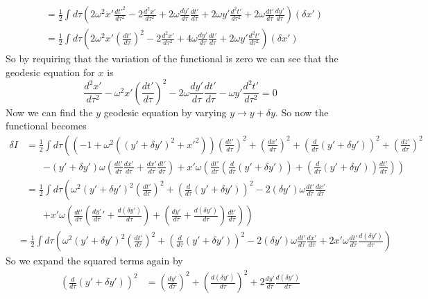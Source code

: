 \documentclass[11pt]{article}
\numberwithin{equation}{section}
\begin{document}
\begin{enumerate}[(a)]
\begin{align*}
&=  \frac{1}{2}\int d\tau \left(2\omega^2x'\frac{dt'^2}{d\tau^2} - 2\frac{d^2x'}{d\tau^2}  + 2\omega\frac{dy'}{d\tau}\frac{dt'}{d\tau} + 2\omega y'\frac{d^2t'}{d\tau^2} + 2\omega\frac{dt'}{d\tau}\frac{dy'}{d\tau}\right)(\delta x')\\
&=  \frac{1}{2}\int d\tau \left(2\omega^2x'\left(\frac{dt'}{d\tau}\right)^2 - 2\frac{d^2x'}{d\tau^2}  + 4\omega\frac{dy'}{d\tau}\frac{dt'}{d\tau} + 2\omega y'\frac{d^2t'}{d\tau^2} \right)(\delta x')
\end{align*}
So by requiring that the variation of the functional is zero we can see that the geodesic equation for $x$ is
$$\frac{d^2x'}{d\tau^2} - \omega^2x'\left(\frac{dt'}{d\tau}\right)^2   - 2\omega\frac{dy'}{d\tau}\frac{dt'}{d\tau}  - \omega y'\frac{d^2t'}{d\tau^2}   = 0$$
Now we can find the $y$ geodesic equation by varying $y\rightarrow y+\delta y$. So now the functional becomes
\begin{align*}
\delta I &= \frac{1}{2}\int d\tau \left(\left(-1 + \omega^2((y'+\delta y')^2 + x'^2)\right)\left(\frac{dt'}{d\tau}\right)^2 + \left(\frac{dx'}{d\tau}\right)^2 + \left(\frac{d}{d\tau}(y'+\delta y')\right)^2  + \left(\frac{dz'}{d\tau}\right)^2\right.\\
&\ \ \ \ \ \ \ \ \left. - (y'+\delta y')\omega\left(\frac{dt'}{d\tau}\frac{dx'}{d\tau} + \frac{dx'}{d\tau}\frac{dt'}{d\tau}\right) + x'\omega \left(\frac{dt'}{d\tau}\left(\frac{d}{d\tau}(y'+\delta y')\right) + \left(\frac{d}{d\tau}(y'+\delta y')\right)\frac{dt'}{d\tau}\right)\right)\\
&= \frac{1}{2}\int d\tau \left(\omega^2(y'+\delta y')^2\left(\frac{dt'}{d\tau}\right)^2  + \left(\frac{d}{d\tau}(y'+\delta y')\right)^2  - 2(\delta y')\omega\frac{dt'}{d\tau}\frac{dx'}{d\tau} \right.\\
& \ \ \ \ \ \ \ \ \left.+ x'\omega \left(\frac{dt'}{d\tau}\left(\frac{dy'}{d\tau}'+\frac{d(\delta y')}{d\tau}\right) + \left(\frac{dy'}{d\tau}+\frac{d(\delta y')}{d\tau}\right)\frac{dt'}{d\tau}\right)\right)
\end{align*}
\begin{align*}
&= \frac{1}{2}\int d\tau \left(\omega^2(y'+\delta y')^2\left(\frac{dt'}{d\tau}\right)^2  + \left(\frac{d}{d\tau}(y'+\delta y')\right)^2  - 2(\delta y')\omega\frac{dt'}{d\tau}\frac{dx'}{d\tau} + 2x'\omega \frac{dt'}{d\tau}\frac{d(\delta y')}{d\tau}\right)
\end{align*}
So we expand the squared terms again by
\begin{align*}
\left(\frac{d}{d\tau}(y'+\delta y')\right)^2 &= \left(\frac{dy'}{d\tau}\right)^2+ \left(\frac{d(\delta y')}{d\tau}\right)^2 + 2\frac{dy'}{d\tau}\frac{d(\delta y')}{d\tau}\\

\end{align*}
\end{enumerate}
\end{document}
